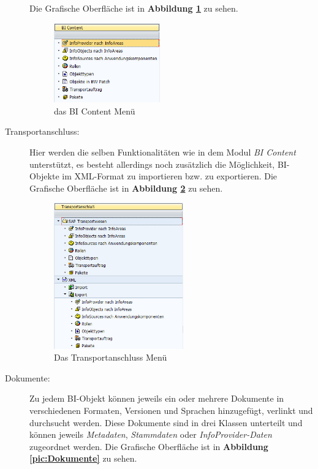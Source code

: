 \begin{description}
Die Grafische Oberfläche ist in \textbf{Abbildung \ref{pic:BIContent}} zu sehen.
\begin{figure}[H]
    \centering
    \includegraphics[width=0.45\textwidth]{files/BIContent}
    \caption{das BI Content Menü}
    \label{pic:BIContent}
\end{figure}
\item[Transportanschluss:] Hier werden die selben Funktionalitäten wie in dem Modul \textit{BI Content} unterstützt, es besteht allerdings noch zusätzlich die Möglichkeit, BI-Objekte im XML-Format zu importieren bzw. zu exportieren.
Die Grafische Oberfläche ist in \textbf{Abbildung \ref{pic:Transportanschluss}} zu sehen.
\begin{figure}[H]
    \centering
    \includegraphics[width=0.55\textwidth]{files/Transportanschluss}
    \caption{Das Transportanschluss Menü}
    \label{pic:Transportanschluss}
\end{figure}
\item[Dokumente:] Zu jedem BI-Objekt können jeweils ein oder mehrere Dokumente in verschiedenen Formaten, Versionen und Sprachen hinzugefügt, verlinkt und durchsucht werden. Diese Dokumente sind in drei Klassen unterteilt und können jeweils \textit{Metadaten}, \textit{Stammdaten} oder \textit{InfoProvider-Daten} zugeordnet werden.
Die Grafische Oberfläche ist in  \textbf{Abbildung \ref{pic:Dokumente}}  zu sehen.

\end{description}
